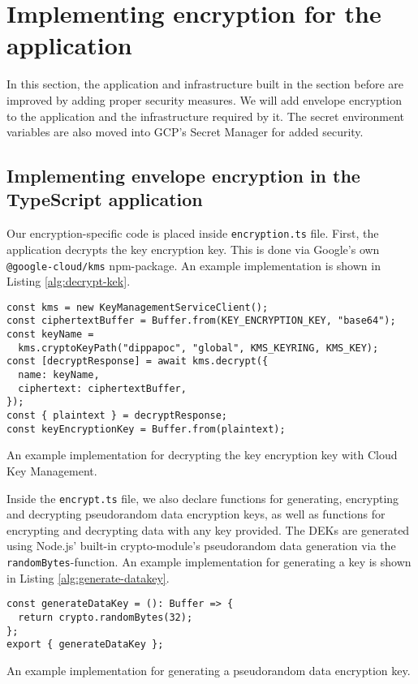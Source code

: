 \section{Implementing encryption for the application}

In this section, the application and infrastructure built in the section before are improved by adding proper security measures.
We will add envelope encryption to the application and the infrastructure required by it.
The secret environment variables are also moved into GCP's Secret Manager for added security.

\subsection{Implementing envelope encryption in the TypeScript application}

Our encryption-specific code is placed inside \texttt{encryption.ts} file.
First, the application decrypts the key encryption key.
This is done via Google's own \\\texttt{@google-cloud/kms} npm-package. An example implementation is shown in Listing \ref{alg:decrypt-kek}.

\begin{algorithm}[htb]
\begin{verbatim}
const kms = new KeyManagementServiceClient();
const ciphertextBuffer = Buffer.from(KEY_ENCRYPTION_KEY, "base64");
const keyName =
  kms.cryptoKeyPath("dippapoc", "global", KMS_KEYRING, KMS_KEY);
const [decryptResponse] = await kms.decrypt({
  name: keyName,
  ciphertext: ciphertextBuffer,
});
const { plaintext } = decryptResponse;
const keyEncryptionKey = Buffer.from(plaintext);
\end{verbatim}
\caption{An example implementation for decrypting the key encryption key with Cloud Key Management.}
\label{alg:decrypt-kek}
\end{algorithm}

Inside the \texttt{encrypt.ts} file, we also declare functions for generating, encrypting and decrypting pseudorandom data encryption keys, as well as functions for encrypting and decrypting data with any key provided.
The DEKs are generated using Node.js' built-in crypto-module's pseudorandom data generation via the \texttt{randomBytes}-function.
An example implementation for generating a key is shown in Listing \ref{alg:generate-datakey}.

\begin{algorithm}[htb]
\begin{verbatim}
const generateDataKey = (): Buffer => {
  return crypto.randomBytes(32);
};
export { generateDataKey };
\end{verbatim}
\caption{An example implementation for generating a pseudorandom data encryption key.}
\label{alg:generate-datakey}
\end{algorithm}

